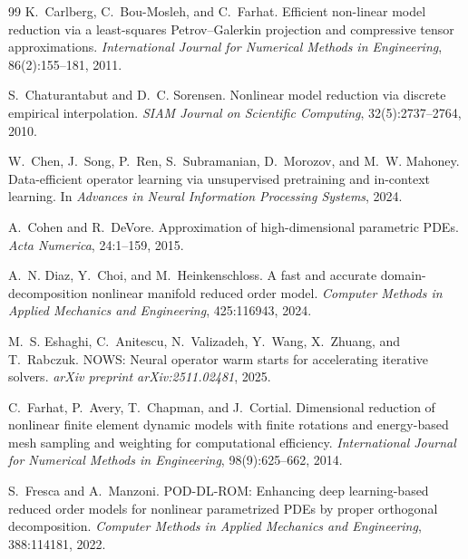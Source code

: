 \begin{thebibliography}{99}
K.~Carlberg, C.~Bou-Mosleh, and C.~Farhat.
\newblock Efficient non-linear model reduction via a least-squares
Petrov--Galerkin projection and compressive tensor approximations.
\newblock \emph{International Journal for Numerical Methods in
Engineering}, 86(2):155--181, 2011.

S.~Chaturantabut and D.~C. Sorensen.
\newblock Nonlinear model reduction via discrete empirical
interpolation.
\newblock \emph{SIAM Journal on Scientific Computing}, 32(5):2737--2764,
2010.

W.~Chen, J.~Song, P.~Ren, S.~Subramanian, D.~Morozov, and M.~W.
Mahoney.
\newblock Data-efficient operator learning via unsupervised pretraining
and in-context learning.
\newblock In \emph{Advances in Neural Information Processing Systems},
2024.

A.~Cohen and R.~DeVore.
\newblock Approximation of high-dimensional parametric PDEs.
\newblock \emph{Acta Numerica}, 24:1--159, 2015.

A.~N. Diaz, Y.~Choi, and M.~Heinkenschloss.
\newblock A fast and accurate domain-decomposition nonlinear manifold
reduced order model.
\newblock \emph{Computer Methods in Applied Mechanics and Engineering},
425:116943, 2024.

M.~S. Eshaghi, C.~Anitescu, N.~Valizadeh, Y.~Wang, X.~Zhuang, and
T.~Rabczuk.
\newblock NOWS: Neural operator warm starts for accelerating iterative
solvers.
\newblock \emph{arXiv preprint arXiv:2511.02481}, 2025.

C.~Farhat, P.~Avery, T.~Chapman, and J.~Cortial.
\newblock Dimensional reduction of nonlinear finite element dynamic
models with finite rotations and energy-based mesh sampling and
weighting for computational efficiency.
\newblock \emph{International Journal for Numerical Methods in
Engineering}, 98(9):625--662, 2014.

S.~Fresca and A.~Manzoni.
\newblock POD-DL-ROM: Enhancing deep learning-based reduced order
models for nonlinear parametrized PDEs by proper orthogonal decomposition.
\newblock \emph{Computer Methods in Applied Mechanics and Engineering},
388:114181, 2022.


\end{thebibliography}
